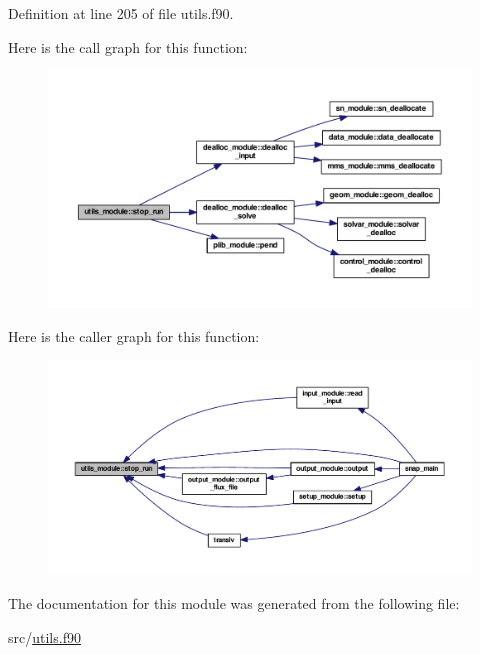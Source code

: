 Definition at line 205 of file utils.\-f90.



Here is the call graph for this function\-:\nopagebreak
\begin{figure}[H]
\begin{center}
\leavevmode
\includegraphics[width=350pt]{classutils__module_a0566fadf7a2baadac1db54851c3045d9_cgraph}
\end{center}
\end{figure}




Here is the caller graph for this function\-:\nopagebreak
\begin{figure}[H]
\begin{center}
\leavevmode
\includegraphics[width=350pt]{classutils__module_a0566fadf7a2baadac1db54851c3045d9_icgraph}
\end{center}
\end{figure}




The documentation for this module was generated from the following file\-:\begin{DoxyCompactItemize}
\item 
src/\hyperlink{utils_8f90}{utils.\-f90}\end{DoxyCompactItemize}

